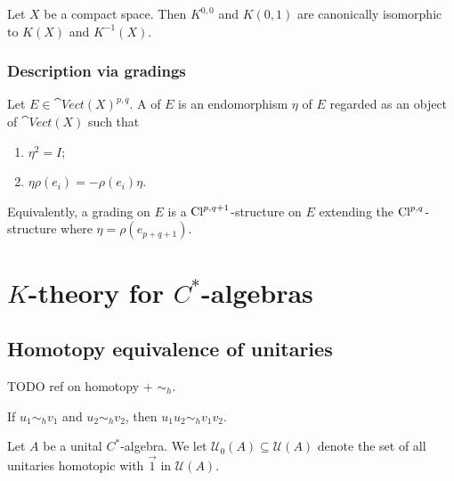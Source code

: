 \begin{theorem}
Let $X$ be a compact space. Then $K^{0,0}$ and $K(0,1)$ are canonically isomorphic to $K(X)$ and $K^{-1}(X)$.
\end{theorem}

\subsection{Description via gradings}
\begin{definition}
Let $E\in \cat{Vect}(X)^{p,q}$. A  of $E$ is an endomorphism $\eta$ of $E$ regarded as an object of $\cat{Vect}(X)$ such that
\begin{enumerate}
\item $\eta^2 = I$;
\item $\eta\rho(e_i) = -\rho(e_i)\eta$.
\end{enumerate}
Equivalently, a grading on $E$ is a $\operatorname{Cl}^{p,q+1}$-structure on $E$ extending the $\operatorname{Cl}^{p,q}$-structure where $\eta = \rho(e_{p+q+1})$.
\end{definition}

\chapter{$K$-theory for $C^*$-algebras}
\section{Homotopy equivalence of unitaries}
TODO ref on homotopy + $\sim_h$.

\begin{lemma} \label{lemma:productHomotopy}
If $u_1 \sim_h v_1$ and $u_2 \sim_h v_2$, then $ u_1u_2\sim_h v_1v_2$.
\end{lemma}

\begin{definition}
Let $A$ be a unital $C^*$-algebra. We let $\mathcal{U}_0(A)\subseteq \mathcal{U}(A)$ denote the set of all unitaries homotopic with $\vec{1}$ in $\mathcal{U}(A)$.
\end{definition}

